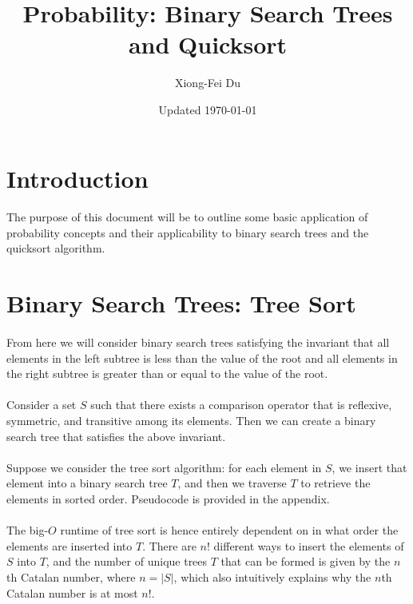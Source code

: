 \documentclass{article}
\title{Probability: Binary Search Trees and Quicksort}
\author{Xiong-Fei Du}
\date{Updated \today}
\begin{document}
\maketitle

\section{Introduction}

\paragraph{} The purpose of this document will be to outline some basic application of probability concepts and their applicability to binary search trees and the quicksort algorithm.

\section{Binary Search Trees: Tree Sort}

\paragraph{} From here we will consider binary search trees satisfying the invariant that all elements in the left subtree is less than the value of the root and all elements in the right subtree is greater than or equal to the value of the root.

\paragraph{} Consider a set $S$ such that there exists a comparison operator that is reflexive, symmetric, and transitive among its elements. Then we can create a binary search tree that satisfies the above invariant.

\paragraph{} Suppose we consider the tree sort algorithm: for each element in $S$, we insert that element into a binary search tree $T$, and then we traverse $T$ to retrieve the elements in sorted order. Pseudocode is provided in the appendix.

\paragraph{} The big-$O$ runtime of tree sort is hence entirely dependent on in what order the elements are inserted into $T$. There are $n!$ different ways to insert the elements of $S$ into $T$, and the number of unique trees $T$ that can be formed is given by the $n$th Catalan number, where $n = |S|$, which also intuitively explains why the $n$th Catalan number is at most $n!$.
\end{document}
